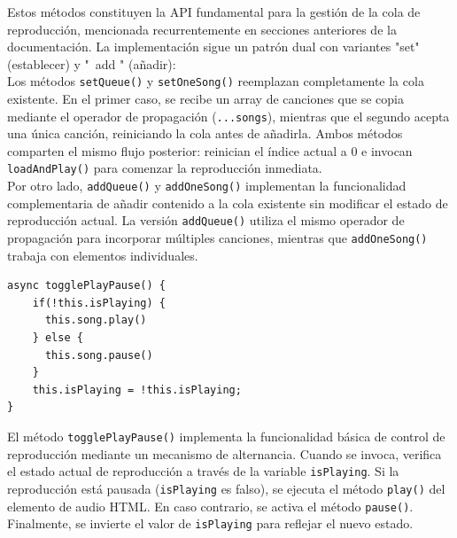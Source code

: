 \documentclass[11pt, a4paper]{article}
\begin{document}
                Estos métodos constituyen la API fundamental para la gestión de la cola de reproducción, mencionada recurrentemente en secciones anteriores de la documentación. La implementación sigue un patrón dual con variantes "set" (establecer) y "\ add " (añadir): \\

                Los métodos \texttt{setQueue()} y \texttt{setOneSong()} reemplazan completamente la cola existente. En el primer caso, se recibe un array de canciones que se copia mediante el operador de propagación (\texttt{...songs}), mientras que el segundo acepta una única canción, reiniciando la cola antes de añadirla. Ambos métodos comparten el mismo flujo posterior: reinician el índice actual a 0 e invocan \texttt{loadAndPlay()} para comenzar la reproducción inmediata. \\

                Por otro lado, \texttt{addQueue()} y \texttt{addOneSong()} implementan la funcionalidad complementaria de añadir contenido a la cola existente sin modificar el estado de reproducción actual. La versión \texttt{addQueue()} utiliza el mismo operador de propagación para incorporar múltiples canciones, mientras que \texttt{addOneSong()} trabaja con elementos individuales. \\

                \begin{lstlisting}[caption={togglePlayPause()}]
async togglePlayPause() {
    if(!this.isPlaying) {
      this.song.play()
    } else {
      this.song.pause()
    }
    this.isPlaying = !this.isPlaying;
}
                \end{lstlisting}
                 
                El método \texttt{togglePlayPause()} implementa la funcionalidad básica de control de reproducción mediante un mecanismo de alternancia. Cuando se invoca, verifica el estado actual de reproducción a través de la variable \texttt{isPlaying}. Si la reproducción está pausada (\texttt{isPlaying} es falso), se ejecuta el método \texttt{play()} del elemento de audio HTML. En caso contrario, se activa el método \texttt{pause()}. Finalmente, se invierte el valor de \texttt{isPlaying} para reflejar el nuevo estado.
\end{document}
